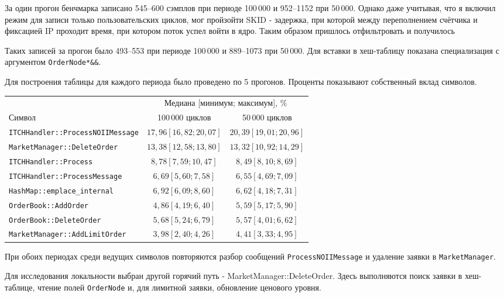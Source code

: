 \documentclass[a4paper,12pt]{article}
\begin{document}
За один прогон бенчмарка
записано 545--600 сэмплов при периоде 100\,000 и 952--1152 при
50\,000. Однако даже учитывая, что я включил режим для записи только
пользовательских циклов, мог пройзойти SKID - задержка, при которой между
переполнением счётчика и фиксацией IP проходит время, при котором поток успел
войти в ядро. Таким образом пришлось отфильтровать и получилось 

Таких записей за прогон
было 493--553 при периоде 100\,000 и 889--1073 при 50\,000. 
Для вставки в хеш-таблицу показана специализация
с аргументом \texttt{OrderNode*\&\&}.

Для построения таблицы для каждого периода было проведено по 5 прогонов.
Проценты показывают собственный вклад символов. 
\begin{center}
\small
\begin{tabular}{lcc}
\toprule
& \multicolumn{2}{c}{Медиана [минимум; максимум], \%} \\
Символ & 100\,000 циклов & 50\,000 циклов \\
\midrule
\texttt{ITCHHandler::ProcessNOIIMessage} & $17{,}96 [16{,}82; 20{,}07]$ & $20{,}39 [19{,}01; 20{,}96]$ \\
\texttt{MarketManager::DeleteOrder} & $13{,}38 [12{,}58; 13{,}80]$ & $13{,}32 [10{,}92; 14{,}29]$ \\
\texttt{ITCHHandler::Process} & $8{,}78 [7{,}59; 10{,}47]$ & $8{,}49 [8{,}10; 8{,}69]$ \\
\texttt{ITCHHandler::ProcessMessage} & $6{,}69 [5{,}60; 7{,}58]$ & $6{,}55 [4{,}69; 7{,}09]$ \\
\texttt{HashMap::emplace\_internal} & $6{,}92 [6{,}09; 8{,}60]$ & $6{,}62 [4{,}18; 7{,}31]$ \\
\texttt{OrderBook::AddOrder} & $4{,}86 [4{,}19; 6{,}40]$ & $5{,}59 [5{,}17; 5{,}90]$ \\
\texttt{OrderBook::DeleteOrder} & $5{,}68 [5{,}24; 6{,}79]$ & $5{,}57 [4{,}01; 6{,}62]$ \\
\texttt{MarketManager::AddLimitOrder} & $3{,}98 [2{,}40; 4{,}26]$ & $4{,}41 [3{,}33; 4{,}95]$ \\
\bottomrule
\end{tabular}
\end{center}

При обоих периодах среди ведущих символов повторяются разбор
сообщений \texttt{ProcessNOIIMessage} и удаление заявки в \texttt{MarketManager}.

Для исследования локальности выбран другой горячий путь -
MarketManager::DeleteOrder. Здесь выполняются поиск заявки
в хеш-таблице, чтение полей \texttt{OrderNode} и, для лимитной заявки,
обновление ценового уровня.
\end{document}
